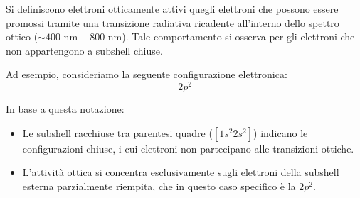 Si definiscono elettroni otticamente attivi quegli elettroni che possono essere promossi tramite una transizione radiativa ricadente all'interno dello spettro ottico (\( \sim 400 \text{ nm} - 800 \text{ nm} \)). Tale comportamento si osserva per gli elettroni che non appartengono a subshell chiuse.

Ad esempio, consideriamo la seguente configurazione elettronica:
\begin{equation}
    [1s^2 2s^2] 2p^2
\end{equation}

In base a questa notazione:
\begin{itemize}
    \item Le subshell racchiuse tra parentesi quadre (\( [1s^2 2s^2] \)) indicano le configurazioni chiuse, i cui elettroni non partecipano alle transizioni ottiche.
    \item L'attività ottica si concentra esclusivamente sugli elettroni della subshell esterna parzialmente riempita, che in questo caso specifico è la \( 2p^2 \).
\end{itemize}
